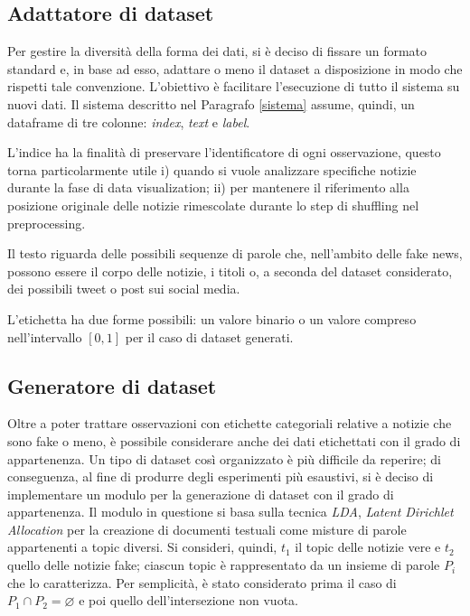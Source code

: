 \documentclass[12pt]{report}
\theoremstyle{definition}
\let\emptyset\varnothing
\begin{document}
\subsection{Adattatore di dataset}\label{adapter}
Per gestire la diversità della forma dei dati, si è deciso di fissare un formato standard e, in base ad esso, adattare o meno il dataset a disposizione in modo che rispetti tale convenzione. L'obiettivo è facilitare l'esecuzione di tutto il sistema su nuovi dati.
Il sistema descritto nel Paragrafo \ref{sistema} assume, quindi, un dataframe di tre colonne: \textit{index}, \textit{text} e \textit{label}.

L'indice ha la finalità di preservare l'identificatore di ogni osservazione, questo torna particolarmente utile i) quando si vuole analizzare specifiche notizie durante la fase di data visualization; ii) per mantenere il riferimento alla posizione originale delle notizie rimescolate durante lo step di shuffling nel preprocessing.

Il testo riguarda delle possibili sequenze di parole che, nell'ambito delle fake news, possono essere il corpo delle notizie, i titoli o, a seconda del dataset considerato, dei possibili tweet o post sui social media.

L'etichetta ha due forme possibili: un valore binario o un valore compreso nell'intervallo $[0,1]$ per il caso di dataset generati.

\subsection{Generatore di dataset}\label{generator}
Oltre a poter trattare osservazioni con etichette categoriali relative a notizie che sono fake o meno, è possibile considerare anche dei dati etichettati con il grado di appartenenza. Un tipo di dataset così organizzato è più difficile da reperire; di conseguenza, al fine di produrre degli esperimenti più esaustivi, si è deciso di implementare un modulo per la generazione di dataset con il grado di appartenenza. Il modulo in questione si basa sulla tecnica \textit{LDA}, \textit{Latent Dirichlet Allocation} \cite{20} per la creazione di documenti testuali come misture di parole appartenenti a topic diversi. 
Si consideri, quindi, $t_1$ il topic delle notizie vere e $t_2$ quello delle notizie fake; ciascun topic è rappresentato da un insieme di parole $P_i$ che lo caratterizza. Per semplicità, è stato considerato prima il caso di $P_1 \cap P_2 = \emptyset$ e poi quello dell'intersezione non vuota.
\end{document}
